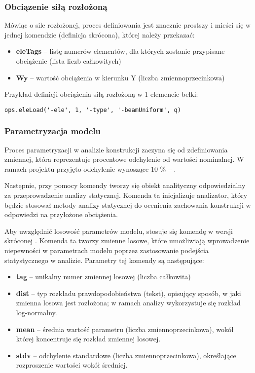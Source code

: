 \subsubsection*{Obciązenie siłą rozłożoną}

Mówiąc o sile rozłożonej, proces definiowania jest znacznie prostszy i mieści się w jednej komendzie
 (definicja skrócona), której należy przekazać:

\begin{itemize}
    \item \textbf{eleTags} – listę numerów elementów, dla których zostanie przypisane obciążenie (lista liczb całkowitych)
    \item \textbf{Wy} – wartość obciążenia w kierunku Y (liczba zmiennoprzecinkowa)
\end{itemize}

Przykład definicji obciążenia siłą rozłożoną w 1 elemencie belki:
\begin{lstlisting}
ops.eleLoad('-ele', 1, '-type', '-beamUniform', q)
\end{lstlisting}

\subsubsection{Parametryzacja modelu}

Proces parametryzacji w analizie konstrukcji zaczyna się od zdefiniowania zmiennej, która reprezentuje procentowe odchylenie
od wartości nominalnej. W ramach projektu przyjęto odchylenie wynoszące 10 \% – .

Następnie, przy pomocy komendy  tworzy się obiekt analityczny odpowiedzialny za przeprowadzenie
analizy statycznej. Komenda ta inicjalizuje analizator, który będzie stosował metody analizy statycznej do ocenienia zachowania konstrukcji w odpowiedzi na przyłożone obciążenia.

Aby uwzględnić losowość parametrów modelu, stosuje się komendę w wersji skróconej . Komenda ta tworzy zmienne losowe, które umożliwiają wprowadzenie niepewności w parametrach modelu
poprzez zastosowanie podejścia statystycznego w analizie. Parametry tej komendy są następujące:

\begin{itemize}
    \item \textbf{tag} – unikalny numer zmiennej losowej (liczba całkowita)
    \item \textbf{dist} – typ rozkładu prawdopodobieństwa (tekst), opisujący sposób, w jaki zmienna losowa jest rozłożona; w ramach analizy wykorzystuje się rozkład log-normalny.
    \item \textbf{mean} – średnia wartość parametru (liczba zmiennoprzecinkowa), wokół której koncentruje się rozkład zmiennej losowej.
    \item \textbf{stdv} – odchylenie standardowe (liczba zmiennoprzecinkowa), określające rozproszenie wartości wokół średniej.
\end{itemize}

